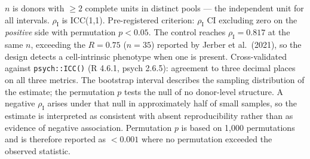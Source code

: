 \documentclass[5p,times,twocolumn]{elsarticle}
\begin{document}
\begin{table}[!htbp]
  \centering
  \small
  \caption{Donor-level reproducibility of the rotenone response, with the differentiation-efficiency control in the same row group.}
  \label{tab:repro}
  \begin{minipage}{\linewidth}\footnotesize
  $n$ is donors with $\geq 2$ complete units in distinct pools --- the independent unit for all intervals. $\rho_\mathrm{I}$ is ICC(1,1). Pre-registered criterion: $\rho_\mathrm{I}$ CI excluding zero on the \emph{positive} side with permutation $p<0.05$. The control reaches $\rho_\mathrm{I}=0.817$ at the same $n$, exceeding the $R=0.75$ ($n=35$) reported by Jerber et al.\ (2021), so the design detects a cell-intrinsic phenotype when one is present. Cross-validated against \texttt{psych::ICC()} (R 4.6.1, psych 2.6.5): agreement to three decimal places on all three metrics. The bootstrap interval describes the sampling distribution of the estimate; the permutation $p$ tests the null of no donor-level structure. A negative $\rho_\mathrm{I}$ arises under that null in approximately half of small samples, so the estimate is interpreted as consistent with absent reproducibility rather than as evidence of negative association. Permutation $p$ is based on 1,000 permutations and is therefore reported as $<0.001$ where no permutation exceeded the observed statistic.
  \end{minipage}
\end{table}
\end{document}
